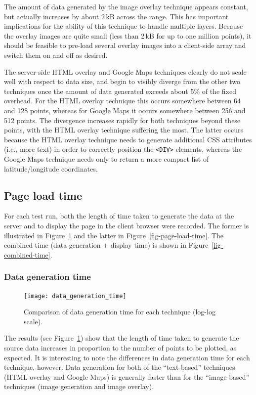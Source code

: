 \documentclass[acmnow]{acmtrans2m}
\begin{document}
The amount of data generated by the image overlay technique appears
constant, but actually increases by about 2\,kB across the range. This
has important implications for the ability of this technique to handle
multiple layers. Because the overlay images are quite small (less than
2\,kB for up to one million points), it should be feasible to pre-load
several overlay images into a client-side array and switch them on and
off as desired.

The server-side HTML overlay and Google Maps techniques clearly do not
scale well with respect to data size, and begin to visibly diverge from
the other two techniques once the amount of data generated exceeds about
5\% of the fixed overhead. For the HTML overlay technique this occurs
somewhere between 64 and 128 points, whereas for Google Maps it occurs
somewhere between 256 and 512 points. The divergence increases rapidly
for both techniques beyond these points, with the HTML overlay technique
suffering the most. The latter occurs because the HTML overlay technique
needs to generate additional CSS attributes (i.e., more text) in order
to correctly position the \verb|<DIV>| elements, whereas the Google Maps
technique needs only to return a more compact list of latitude/longitude
coordinates.


\subsection{Page load time}

For each test run, both the length of time taken to generate the data at
the server and to display the page in the client browser were recorded.
The former is illustrated in Figure~\ref{fig-data-generation-time} and
the latter in Figure~\ref{fig-page-load-time}. The combined time (data
generation + display time) is shown in Figure~\ref{fig-combined-time}.


\subsubsection{Data generation time}


\begin{figure}
	\centering
	\texttt{[image: data\_generation\_time]}
	\caption{Comparison of data generation time for each technique (log-log scale).}
	\label{fig-data-generation-time}
\end{figure}


The results (see Figure~\ref{fig-data-generation-time}) show that the
length of time taken to generate the source data increases in proportion
to the number of points to be plotted, as expected. It is interesting to
note the differences in data generation time for each technique,
however. Data generation for both of the ``text-based'' techniques (HTML
overlay and Google Maps) is generally faster than for the
``image-based'' techniques (image generation and image overlay).
\end{document}
